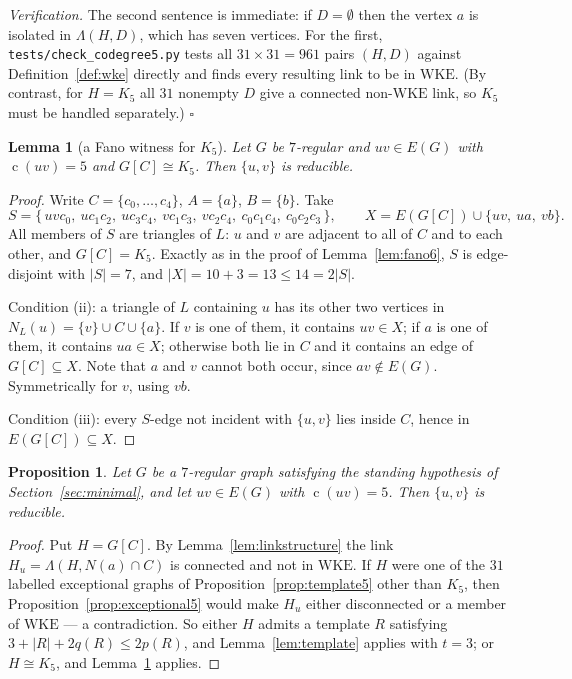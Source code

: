 \documentclass[11pt,a4paper]{amsart}
\theoremstyle{plain}
\newtheorem{lemma}[theorem]{Lemma}
\newtheorem{proposition}[theorem]{Proposition}
\theoremstyle{definition}
\newcommand{\WKE}{\mathrm{WKE}}
\newcommand{\cod}{\operatorname{c}}
\newcommand{\N}{N}
\begin{document}
\emph{Verification.} The second sentence is immediate: if $D=\emptyset$ then
the vertex $a$ is isolated in $\Lambda(H,D)$, which has seven vertices. For the
first, \texttt{tests/check\_codegree5.py} tests all $31\times 31=961$ pairs
$(H,D)$ against Definition~\ref{def:wke} directly and finds every resulting
link to be in $\WKE$. (By contrast, for $H=K_5$ all $31$ nonempty $D$ give a
connected non-$\WKE$ link, so $K_5$ must be handled separately.)
\hfill$\square$

\begin{lemma}[a Fano witness for $K_5$]\label{lem:fano5}
Let $G$ be $7$-regular and $uv\in E(G)$ with $\cod(uv)=5$ and $G[C]\cong K_5$.
Then $\{u,v\}$ is reducible.
\end{lemma}

\begin{proof}
Write $C=\{c_0,\dots,c_4\}$, $A=\{a\}$, $B=\{b\}$. Take
\[
  S=\{\,uvc_0,\ uc_1c_2,\ uc_3c_4,\ vc_1c_3,\ vc_2c_4,\ c_0c_1c_4,\
        c_0c_2c_3\,\},
  \qquad
  X=E(G[C])\cup\{uv,\ ua,\ vb\}.
\]
All members of $S$ are triangles of $L$: $u$ and $v$ are adjacent to all of
$C$ and to each other, and $G[C]=K_5$. Exactly as in the proof of
Lemma~\ref{lem:fano6}, $S$ is edge-disjoint with $|S|=7$, and
$|X|=10+3=13\le 14=2|S|$.

Condition (ii): a triangle of $L$ containing $u$ has its other two vertices in
$\N_L(u)=\{v\}\cup C\cup\{a\}$. If $v$ is one of them, it contains $uv\in X$;
if $a$ is one of them, it contains $ua\in X$; otherwise both lie in $C$ and it
contains an edge of $G[C]\subseteq X$. Note that $a$ and $v$ cannot both occur,
since $av\notin E(G)$. Symmetrically for $v$, using $vb$.

Condition (iii): every $S$-edge not incident with $\{u,v\}$ lies inside $C$,
hence in $E(G[C])\subseteq X$.
\end{proof}

\begin{proposition}\label{prop:codeg5}
Let $G$ be a $7$-regular graph satisfying the standing hypothesis of
Section~\ref{sec:minimal}, and let $uv\in E(G)$ with $\cod(uv)=5$. Then
$\{u,v\}$ is reducible.
\end{proposition}

\begin{proof}
Put $H=G[C]$. By Lemma~\ref{lem:linkstructure} the link
$H_u=\Lambda(H,\N(a)\cap C)$ is connected and not in $\WKE$. If $H$ were one
of the $31$ labelled exceptional graphs of
Proposition~\ref{prop:template5} other than $K_5$, then
Proposition~\ref{prop:exceptional5} would make $H_u$ either disconnected or a
member of $\WKE$ --- a contradiction. So either $H$ admits a template
$R$ satisfying $3+|R|+2q(R)\le 2p(R)$, and Lemma~\ref{lem:template} applies
with $t=3$; or $H\cong K_5$, and Lemma~\ref{lem:fano5} applies.
\end{proof}
\end{document}
